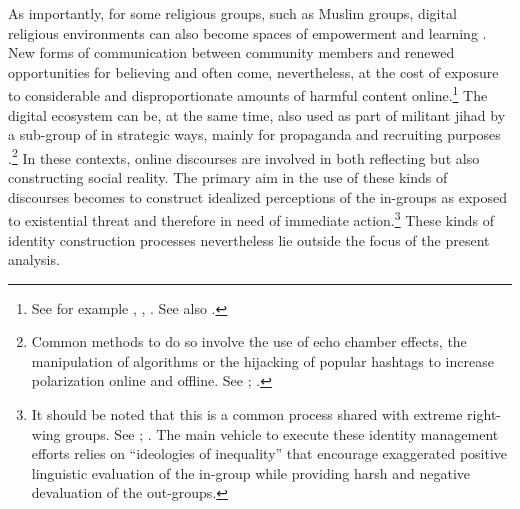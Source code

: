 \documentclass[output=paper,colorlinks,citecolor=brown]{langscibook}
\begin{document}
\largerpage
As importantly, for some religious  groups, such as Muslim groups, digital religious environments can also become spaces of empowerment and learning \citep{bunt2000}. New forms of communication between  community members and renewed opportunities for believing and  often come, nevertheless, at the cost of exposure to considerable and disproportionate amounts of harmful content online.\footnote{%
See for example \citet[para. 21]{unsr2020}, \citet{faloppa_gambacorta_odekerken2023}, \citet[35 et seq.]{eu_fra2023}. See also \citet{topidi2019_words1}.}
The digital ecosystem can be, at the same time, also used as part of militant jihad by a sub-group of  in strategic ways, mainly for propaganda and recruiting purposes \citep[18]{kohler_ebner2019}.\footnote{%
Common methods to do so involve the use of echo chamber effects, the manipulation of algorithms or the hijacking of popular hashtags to increase polarization online and offline. See \citet{davey_ebner2017}; \citet{farwell2014}.} 
In these contexts, online discourses are involved in both reflecting but also constructing social reality. The primary aim in the use of these kinds of discourses becomes to construct idealized perceptions of the in-groups as exposed to existential threat and therefore in need of immediate action.\footnote{%
It should be noted that this is a common process shared with extreme right-wing groups. See \citet[205--207]{muller_harrendorf_mischler2022}; \citet{mischler_muller_geng_harrendorf2019}. The main vehicle to execute these identity management efforts relies on ``ideologies of inequality'' that encourage exaggerated positive linguistic evaluation of the in-group while providing harsh and negative devaluation of the out-groups.} 
These kinds of identity construction processes nevertheless lie outside the focus of the present analysis.
\end{document}
